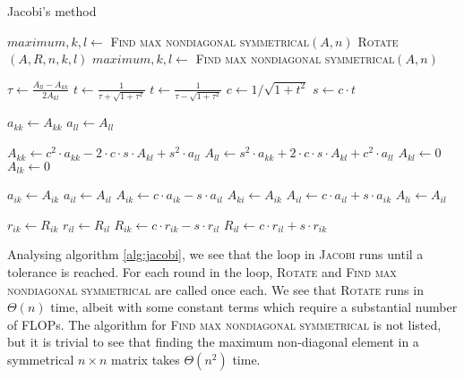 \documentclass[a4paper]{article}
\begin{document}
\begin{algorithm}
\caption{Jacobi's method} \label{alg:jacobi}
\begin{algorithmic}[1]
  \Statex {}
  \State $maximum, k, l \gets$ \textsc{Find max nondiagonal symmetrical}$(A,n)$
    \State \textsc{Rotate}$(A, R, n, k, l)$
    \State $maximum, k, l \gets$ \textsc{Find max nondiagonal symmetrical}$(A,n)$
  \EndWhile
  \EndProcedure

  \Statex %



  \State $\tau \gets \frac{A_{ll} - A_{kk}}{2A_{kl}}$
      \State $t \gets \frac{1}{\tau + \sqrt{1 + \tau^{2}}}$
  \Else
      \State $t \gets \frac{1}{\tau - \sqrt{1 + \tau^{2}}}$
  \EndIf
  \State $c \gets 1 / \sqrt{1+t^{2}}$
  \State $s \gets c \cdot t$

  \State $a_{kk} \gets A_{kk}$
  \State $a_{ll} \gets A_{ll}$

  \State $A_{kk} \gets c^{2} \cdot a_{kk} - 2 \cdot c \cdot s \cdot A_{kl} + s^{2} \cdot a_{ll}$
  \State $A_{ll} \gets s^{2} \cdot a_{kk} + 2 \cdot c \cdot s \cdot A_{kl} + c^{2} \cdot a_{ll}$
  \State $A_{kl} \gets 0$
  \State $A_{lk} \gets 0$

          \State $a_{ik} \gets A_{ik}$
          \State $a_{il} \gets A_{il}$
          \State $A_{ik} \gets c \cdot a_{ik} - s \cdot a_{il}$
          \State $A_{ki} \gets A_{ik}$
          \State $A_{il} \gets c \cdot a_{il} + s \cdot a_{ik}$
          \State $A_{li} \gets A_{il}$
      \EndIf

        \State $r_{ik} \gets R_{ik}$
        \State $r_{il} \gets R_{il}$
        \State $R_{ik} \gets c \cdot r_{ik} - s \cdot r_{il}$
        \State $R_{il} \gets c \cdot r_{il} + s \cdot r_{ik}$
    \EndFor


  \EndProcedure
\end{algorithmic}
\end{algorithm}

Analysing algorithm \ref{alg:jacobi}, we see that the loop in \textsc{Jacobi} runs until a tolerance is reached. For each round in the loop, \textsc{Rotate} and \textsc{Find max nondiagonal symmetrical} are called once each. We see that \textsc{Rotate} runs in $\Theta(n)$ time, albeit with some constant terms which require a substantial number of FLOPs. The algorithm for \textsc{Find max nondiagonal symmetrical} is not listed, but it is trivial to see that finding the maximum non-diagonal element in a symmetrical $n \times n$ matrix takes $\Theta(n^2)$ time.
\end{document}
